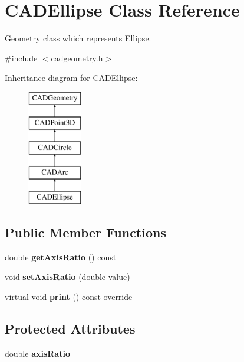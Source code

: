 \hypertarget{class_c_a_d_ellipse}{}\section{C\+A\+D\+Ellipse Class Reference}
\label{class_c_a_d_ellipse}


Geometry class which represents Ellipse.  




{\ttfamily \#include $<$cadgeometry.\+h$>$}

Inheritance diagram for C\+A\+D\+Ellipse\+:\begin{figure}[H]
\begin{center}
\leavevmode
\includegraphics[height=5.000000cm]{class_c_a_d_ellipse}
\end{center}
\end{figure}
\subsection*{Public Member Functions}
\begin{DoxyCompactItemize}
\item 
double {\bfseries get\+Axis\+Ratio} () const \hypertarget{class_c_a_d_ellipse_a54e9ced7ab524253326a0f6379ef5a3a}{}\label{class_c_a_d_ellipse_a54e9ced7ab524253326a0f6379ef5a3a}

\item 
void {\bfseries set\+Axis\+Ratio} (double value)\hypertarget{class_c_a_d_ellipse_ac49d3acec034fa23cb51b51f9c454305}{}\label{class_c_a_d_ellipse_ac49d3acec034fa23cb51b51f9c454305}

\item 
virtual void {\bfseries print} () const  override\hypertarget{class_c_a_d_ellipse_a2b8f06c7da2cde09a252754d515a5be2}{}\label{class_c_a_d_ellipse_a2b8f06c7da2cde09a252754d515a5be2}

\end{DoxyCompactItemize}
\subsection*{Protected Attributes}
\begin{DoxyCompactItemize}
\item 
double {\bfseries axis\+Ratio}\hypertarget{class_c_a_d_ellipse_a058d2582f555840c258e2a93e15843de}{}\label{class_c_a_d_ellipse_a058d2582f555840c258e2a93e15843de}

\end{DoxyCompactItemize}
